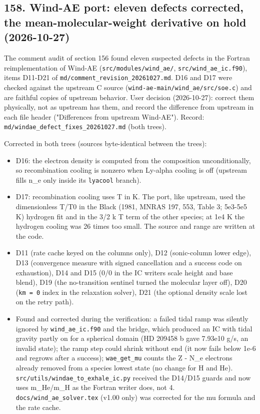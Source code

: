 \documentclass[english,a4paper]{my_memo}
\providecommand{\tightlist}{\setlength{\itemsep}{0pt}\setlength{\parskip}{0pt}}
\begin{document}
\subsection{158. Wind-AE port: eleven defects corrected, the mean-molecular-weight derivative on hold (2026-10-27)}\label{158-wind-ae-port-eleven-defects-corrected-the-mean-molecular-weight-derivative-on-hold-2026-10-27}

The comment audit of section 156 found eleven suspected defects in the Fortran reimplementation of Wind-AE (\texttt{src/modules/wind\_ae/}, \texttt{src/wind\_ae\_ic.f90}), items D11-D21 of \texttt{md/comment\_revision\_20261027.md}. D16 and D17 were checked against the upstream C source (\texttt{wind-ae-main/wind\_ae/src/soe.c}) and are faithful copies of upstream behavior. User decision (2026-10-27): correct them physically, not as upstream has them, and record the difference from upstream in each file header ("Differences from upstream Wind-AE"). Record: \texttt{md/windae\_defect\_fixes\_20261027.md} (both trees).

Corrected in both trees (sources byte-identical between the trees):

\begin{itemize}
\tightlist
\item
  D16: the electron density is computed from the composition unconditionally, so recombination cooling is nonzero when Ly-alpha cooling is off (upstream fills n\_e only inside its \texttt{lyacool} branch).
\item
  D17: recombination cooling uses T in K. The port, like upstream, used the dimensionless T/T0 in the Black (1981, MNRAS 197, 553, Table 3; 5e3-5e5 K) hydrogen fit and in the 3/2 k T term of the other species; at 1e4 K the hydrogen cooling was 26 times too small. The source and range are written at the code.
\item
  D11 (rate cache keyed on the columns only), D12 (sonic-column lower edge), D13 (convergence measure with signed cancellation and a success code on exhaustion), D14 and D15 (0/0 in the IC writer\textquotesingle s scale height and base blend), D19 (the no-transition sentinel turned the molecular layer off), D20 (\texttt{km\ =\ 0} index in the relaxation solver), D21 (the optional density scale lost on the retry path).
\item
  Found and corrected during the verification: a failed tidal ramp was silently ignored by \texttt{wind\_ae\_ic.f90} and the bridge, which produced an IC with tidal gravity partly on for a spherical domain (HD 209458 b gave 7.93e10 g/s, an invalid state); the ramp step could shrink without end (it now fails below 1e-6 and regrows after a success); \texttt{wae\_get\_mu} counts the Z - N\_e electrons already removed from a species\textquotesingle{} lowest state (no change for H and He). \texttt{src/utils/windae\_to\_exhale\_ic.py} received the D14/D15 guards and now uses m\_He/m\_H as the Fortran writer does, not 4. \texttt{docs/wind\_ae\_solver.tex} (v1.00 only) was corrected for the mu formula and the rate cache.
\end{itemize}
\end{document}

